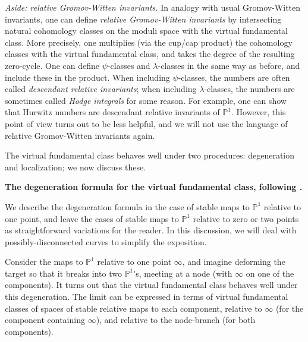 \documentclass[12pt,letterpaper]{amsart}
\newcommand{\bpoint}[1]{\vspace{3mm}\par \noindent \refstepcounter{subsection}{\bf \thesubsection.} 
  {\bf #1.} }
\newcommand{\proj}{\mathbb P}
\newcommand{\la}{\lambda}
\begin{document}
{\noindent
{\em Aside:  relative Gromov-Witten invariants.}
In analogy with usual Gromov-Witten invariants, one can define {\em
  relative Gromov-Witten invariants} by intersecting natural
cohomology classes on the moduli space with the virtual fundamental
class.  More precisely, one multiplies (via the cup/cap product) the
cohomology classes with the virtual fundamental class, and takes the
degree of the resulting zero-cycle.  One can define $\psi$-classes and
$\la$-classes in the same way as before, and include these in the
product.  When including $\psi$-classes, the numbers are often called
{\em descendant relative invariants}; when including $\la$-classes,
the numbers are sometimes called {\em Hodge integrals} for some
reason.  For example, one can show that 
Hurwitz numbers are descendant relative
invariants of $\proj^1$.  However, this point of view turns out to be
less helpful, and we will not use the language of relative
Gromov-Witten invariants again.

The virtual fundamental class behaves well under two procedures:
degeneration and localization; we now discuss these.

\bpoint{The degeneration formula for the virtual fundamental class,
  following \cite{li2}}

We describe the degeneration formula in the case of stable maps to
$\proj^1$ relative to one point, and leave the cases of stable maps to
$\proj^1$ relative to zero or two points as straightforward
variations for the reader.  In this discussion, we will deal with
possibly-disconnected curves to simplify the exposition.

Consider the maps to $\proj^1$ relative to one point $\infty$, and
imagine deforming the target so that it breaks into two $\proj^1$'s,
meeting at a node (with $\infty$ on one of the components).  It turns
out that the virtual fundamental class behaves well under this
degeneration.  The limit can be expressed in terms of virtual
fundamental classes of spaces of stable relative maps to each
component, relative to $\infty$ (for the component containing
$\infty$), and relative to the node-branch (for both components).

}
\end{document}
